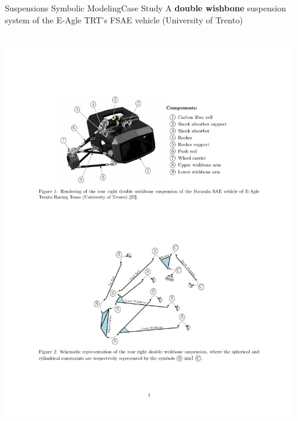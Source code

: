 \begin{frame}{Suspensions Symbolic Modeling}{Case Study}
  A \textbf{double wishbone} suspension system of the E-Agle TRT's FSAE vehicle (University of Trento) \\[1.0em]
  \begin{columns}
    \begin{column}[c]{0.65\textwidth}
      \centering
      \includegraphics[width=1.0\textwidth]{./figures/render_all.pdf}
    \end{column}
    \hspace*{1em}
    \begin{column}[c]{0.25\textwidth}
      \centering

\end{column}
\end{columns}
\end{frame}
